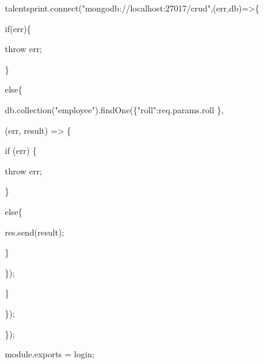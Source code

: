 \documentclass[11pt,twoside]{article}
\begin{document}
    \hspace*{15}talentsprint.connect("mongodb://localhost:27017/crud",(err,db)=>\{

      \hspace*{30}if(err)\{

        \hspace*{45}throw err;

        \hspace*{30}\} 

        \hspace*{30}else\{

          \hspace*{45}db.collection("employee").findOne(\{"roll":req.params.roll \}, 

          \hspace*{45}(err, result) => \{

            \hspace*{60}if (err) \{

              \hspace*{75}throw err;

              \hspace*{60}\} 
            
              \hspace*{60}else\{

                \hspace*{75}res.send(result);

                \hspace*{60}\}

          \hspace*{45}\});

        \hspace*{30}\}

      \hspace*{15}\});

\});

module.exports = login;
\end{document}
